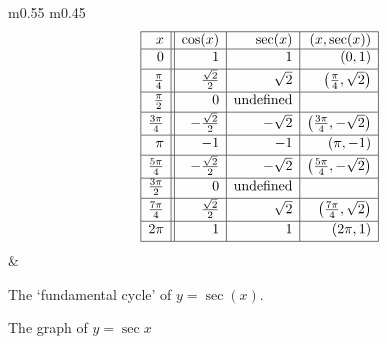 \noindent\hskip-10pt\begin{minipage}{\textwidth}
\begin{center}
\begin{tabular}{ m{} m{}}
\setlength{\extrarowheight}{2pt}
\[ \begin{array}{|r||r|r|r|}  

\hline

 x & \cos(x) & \sec(x) & (x,\sec(x)) \\ \hline
0  & 1 & 1 & (0,1) \\ [2pt]   \hline
\frac{\pi}{4}  & \frac{\sqrt{2}}{2} & \sqrt{2} & \left(\frac{\pi}{4}, \sqrt{2} \right) \\ [2pt] \hline 
\frac{\pi}{2}  & 0 & \text{undefined} &  \\ [2pt] \hline 
\frac{3\pi}{4}  & -\frac{\sqrt{2}}{2} & -\sqrt{2} & \left(\frac{3\pi}{4}, -\sqrt{2} \right) \\ [2pt] \hline 
\pi & -1 & -1 &  (\pi, -1) \\ [2pt] \hline 
\frac{5\pi}{4}  & -\frac{\sqrt{2}}{2} & -\sqrt{2} & \left(\frac{5\pi}{4}, -\sqrt{2} \right) \\ [2pt] \hline 
\frac{3\pi}{2}  & 0 & \text{undefined} & \\ [2pt] \hline 
\frac{7\pi}{4}  & \frac{\sqrt{2}}{2} & \sqrt{2} & \left(\frac{7\pi}{4}, \sqrt{2} \right) \\ [2pt] \hline 
2\pi  & 1 &  1& (2\pi, 1) \\  [2pt] \hline
\end{array} \] \setlength{\extrarowheight}{0pt} &

\end{tabular}
\end{center}
\captionsetup{type=figure}
\caption{The `fundamental cycle' of $y = \sec(x)$.}\label{fig:secgraph1}
\end{minipage}

\bigskip

\noindent\begin{minipage}{\textwidth}
\begin{center}
\end{center}
\captionsetup{type=figure}
\caption{The graph of $y=\sec{x}$}\label{fig:secgraph2}
\end{minipage}

\medskip

